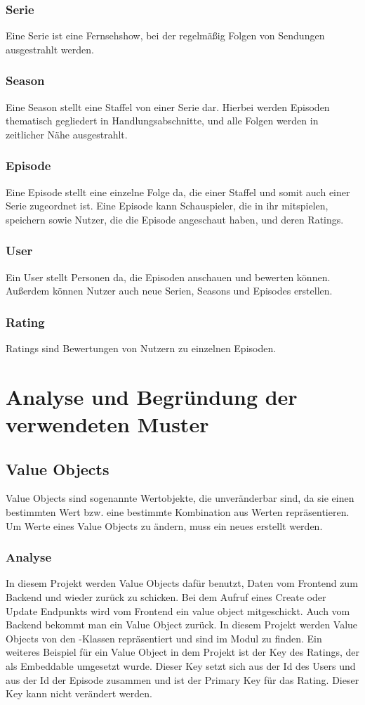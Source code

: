 \subsubsection{Serie}
Eine Serie ist eine Fernsehshow, bei der regelmäßig Folgen von Sendungen ausgestrahlt werden.
\subsubsection{Season}
Eine Season stellt eine Staffel von einer Serie dar. Hierbei werden Episoden thematisch gegliedert in Handlungsabschnitte, und alle Folgen werden in zeitlicher Nähe ausgestrahlt.
\subsubsection{Episode}
Eine Episode stellt eine einzelne Folge da, die einer Staffel und somit auch einer Serie zugeordnet ist. Eine Episode kann Schauspieler, die in ihr mitspielen, speichern sowie Nutzer, die die Episode angeschaut haben, und deren Ratings.
\subsubsection{User}
Ein User stellt Personen da, die Episoden anschauen und bewerten können. Außerdem können Nutzer auch neue Serien, Seasons und Episodes erstellen.
\subsubsection{Rating}
Ratings sind Bewertungen von Nutzern zu einzelnen Episoden.

\section{Analyse und Begründung der verwendeten Muster}

    \subsection{Value Objects} \label{1.vo}
    Value Objects sind sogenannte Wertobjekte, die unveränderbar sind, da sie einen bestimmten Wert bzw. eine bestimmte Kombination aus Werten repräsentieren. Um Werte eines Value Objects zu ändern, muss ein neues erstellt werden.

        \subsubsection{Analyse}
        In diesem Projekt werden Value Objects dafür benutzt, Daten vom Frontend zum Backend und wieder zurück zu schicken. Bei dem Aufruf eines Create oder Update Endpunkts wird vom Frontend ein value object mitgeschickt. Auch vom Backend bekommt man ein Value Object zurück. In diesem Projekt werden Value Objects von den -Klassen repräsentiert und sind im Modul  zu finden.
        Ein weiteres Beispiel für ein Value Object in dem Projekt ist der Key des Ratings, der als Embeddable umgesetzt wurde. Dieser Key setzt sich aus der Id des Users und aus der Id der Episode zusammen und ist der Primary Key für das Rating. Dieser Key kann nicht verändert werden.

